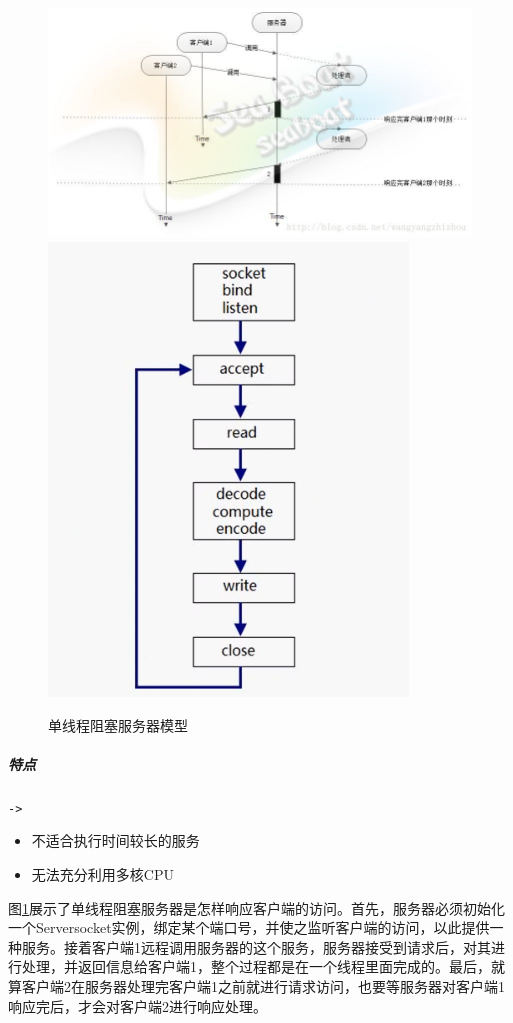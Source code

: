 \documentclass[UTF8,a4paper,12pt]{ctexbook}
\begin{document}
			\begin{figure}[htbp]
				\centering
				\includegraphics[scale = 1.8]{figures/IO_SingleThread_Blocking.jpg}
				\includegraphics[scale = 0.7]{figures/iterative.png}
				\caption{单线程阻塞服务器模型}
				\label{Blocking_Single}
			\end{figure}
		
		
		\subparagraph{特点}\verb|->|
			\begin{itemize}[itemindent = 1em]
				\item 不适合执行时间较长的服务
				\item 无法充分利用多核CPU
			\end{itemize}
			
		图\ref{Blocking_Single}展示了单线程阻塞服务器是怎样响应客户端的访问。首先，服务器必须初始化一个Serversocket实例，绑定某个端口号，并使之监听客户端的访问，以此提供一种服务。接着客户端1远程调用服务器的这个服务，服务器接受到请求后，对其进行处理，并返回信息给客户端1，整个过程都是在一个线程里面完成的。最后，就算客户端2在服务器处理完客户端1之前就进行请求访问，也要等服务器对客户端1响应完后，才会对客户端2进行响应处理。
		
\end{document}
